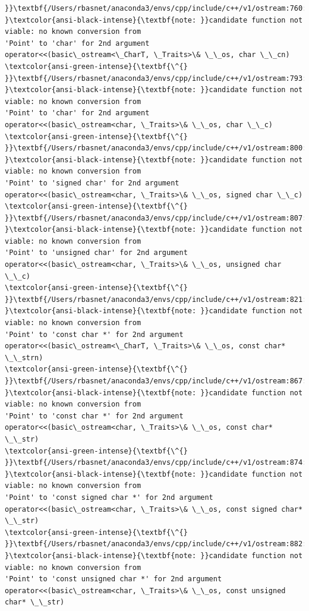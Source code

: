 \documentclass[11pt]{article}
\begin{document}
\begin{Verbatim}[commandchars=\\\{\}]
}}\textbf{/Users/rbasnet/anaconda3/envs/cpp/include/c++/v1/ostream:760:1:
}\textcolor{ansi-black-intense}{\textbf{note: }}candidate function not viable: no known conversion from
'Point' to 'char' for 2nd argument
operator<<(basic\_ostream<\_CharT, \_Traits>\& \_\_os, char \_\_cn)
\textcolor{ansi-green-intense}{\textbf{\^{}
}}\textbf{/Users/rbasnet/anaconda3/envs/cpp/include/c++/v1/ostream:793:1:
}\textcolor{ansi-black-intense}{\textbf{note: }}candidate function not viable: no known conversion from
'Point' to 'char' for 2nd argument
operator<<(basic\_ostream<char, \_Traits>\& \_\_os, char \_\_c)
\textcolor{ansi-green-intense}{\textbf{\^{}
}}\textbf{/Users/rbasnet/anaconda3/envs/cpp/include/c++/v1/ostream:800:1:
}\textcolor{ansi-black-intense}{\textbf{note: }}candidate function not viable: no known conversion from
'Point' to 'signed char' for 2nd argument
operator<<(basic\_ostream<char, \_Traits>\& \_\_os, signed char \_\_c)
\textcolor{ansi-green-intense}{\textbf{\^{}
}}\textbf{/Users/rbasnet/anaconda3/envs/cpp/include/c++/v1/ostream:807:1:
}\textcolor{ansi-black-intense}{\textbf{note: }}candidate function not viable: no known conversion from
'Point' to 'unsigned char' for 2nd argument
operator<<(basic\_ostream<char, \_Traits>\& \_\_os, unsigned char \_\_c)
\textcolor{ansi-green-intense}{\textbf{\^{}
}}\textbf{/Users/rbasnet/anaconda3/envs/cpp/include/c++/v1/ostream:821:1:
}\textcolor{ansi-black-intense}{\textbf{note: }}candidate function not viable: no known conversion from
'Point' to 'const char *' for 2nd argument
operator<<(basic\_ostream<\_CharT, \_Traits>\& \_\_os, const char* \_\_strn)
\textcolor{ansi-green-intense}{\textbf{\^{}
}}\textbf{/Users/rbasnet/anaconda3/envs/cpp/include/c++/v1/ostream:867:1:
}\textcolor{ansi-black-intense}{\textbf{note: }}candidate function not viable: no known conversion from
'Point' to 'const char *' for 2nd argument
operator<<(basic\_ostream<char, \_Traits>\& \_\_os, const char* \_\_str)
\textcolor{ansi-green-intense}{\textbf{\^{}
}}\textbf{/Users/rbasnet/anaconda3/envs/cpp/include/c++/v1/ostream:874:1:
}\textcolor{ansi-black-intense}{\textbf{note: }}candidate function not viable: no known conversion from
'Point' to 'const signed char *' for 2nd argument
operator<<(basic\_ostream<char, \_Traits>\& \_\_os, const signed char* \_\_str)
\textcolor{ansi-green-intense}{\textbf{\^{}
}}\textbf{/Users/rbasnet/anaconda3/envs/cpp/include/c++/v1/ostream:882:1:
}\textcolor{ansi-black-intense}{\textbf{note: }}candidate function not viable: no known conversion from
'Point' to 'const unsigned char *' for 2nd argument
operator<<(basic\_ostream<char, \_Traits>\& \_\_os, const unsigned char* \_\_str)

\end{Verbatim}
\end{document}

